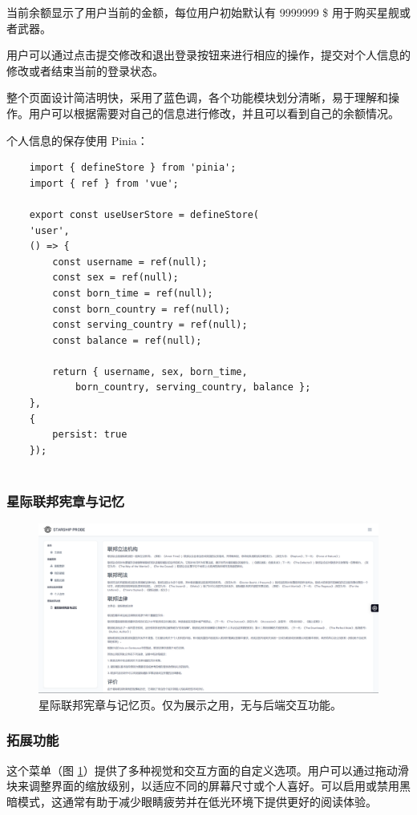 \documentclass{base}
\begin{document}
当前余额显示了用户当前的金额，每位用户初始默认有 9999999 \$ 用于购买星舰或者武器。

用户可以通过点击提交修改和退出登录按钮来进行相应的操作，提交对个人信息的修改或者结束当前的登录状态。

整个页面设计简洁明快，采用了蓝色调，各个功能模块划分清晰，易于理解和操作。用户可以根据需要对自己的信息进行修改，并且可以看到自己的余额情况。

个人信息的保存使用 Pinia：
\begin{verbatim}
	import { defineStore } from 'pinia';
	import { ref } from 'vue';
	
	export const useUserStore = defineStore(
	'user',
	() => {
		const username = ref(null);
		const sex = ref(null);
		const born_time = ref(null);
		const born_country = ref(null);
		const serving_country = ref(null);
		const balance = ref(null);
		
		return { username, sex, born_time, 
			born_country, serving_country, balance };
	},
	{
		persist: true
	});
	
\end{verbatim}

\subsubsection{星际联邦宪章与记忆}
\begin{figure}[H]
	\centering
	\includegraphics[width=\linewidth]{images/StarLaw}
	\caption{星际联邦宪章与记忆页。仅为展示之用，无与后端交互功能。}
	\label{fig:starlaw}
\end{figure}


\subsubsection{拓展功能}

这个菜单（图 \ref{fig:starlaw}）提供了多种视觉和交互方面的自定义选项。用户可以通过拖动滑块来调整界面的缩放级别，以适应不同的屏幕尺寸或个人喜好。可以启用或禁用黑暗模式，这通常有助于减少眼睛疲劳并在低光环境下提供更好的阅读体验。
\end{document}
